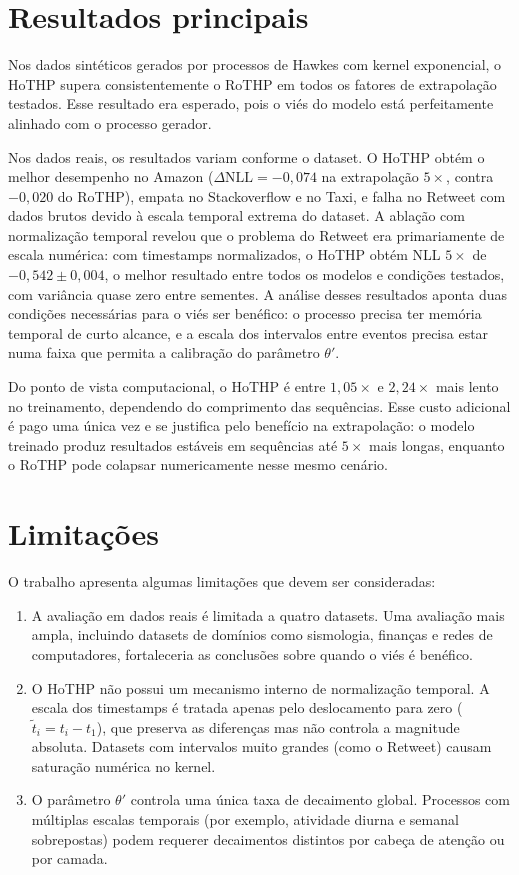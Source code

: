 \section{Resultados principais}

Nos dados sintéticos gerados por processos de Hawkes com kernel exponencial, o HoTHP supera consistentemente o RoTHP em todos os fatores de extrapolação testados. Esse resultado era esperado, pois o viés do modelo está perfeitamente alinhado com o processo gerador.

Nos dados reais, os resultados variam conforme o dataset. O HoTHP obtém o melhor desempenho no Amazon ($\Delta\text{NLL} = -0{,}074$ na extrapolação $5\times$, contra $-0{,}020$ do RoTHP), empata no Stackoverflow e no Taxi, e falha no Retweet com dados brutos devido à escala temporal extrema do dataset. A ablação com normalização temporal revelou que o problema do Retweet era primariamente de escala numérica: com timestamps normalizados, o HoTHP obtém NLL $5\times$ de $-0{,}542 \pm 0{,}004$, o melhor resultado entre todos os modelos e condições testados, com variância quase zero entre sementes. A análise desses resultados aponta duas condições necessárias para o viés ser benéfico: o processo precisa ter memória temporal de curto alcance, e a escala dos intervalos entre eventos precisa estar numa faixa que permita a calibração do parâmetro $\theta'$.

Do ponto de vista computacional, o HoTHP é entre $1{,}05\times$ e $2{,}24\times$ mais lento no treinamento, dependendo do comprimento das sequências. Esse custo adicional é pago uma única vez e se justifica pelo benefício na extrapolação: o modelo treinado produz resultados estáveis em sequências até $5\times$ mais longas, enquanto o RoTHP pode colapsar numericamente nesse mesmo cenário.

\section{Limitações}

O trabalho apresenta algumas limitações que devem ser consideradas:

\begin{enumerate}
    \item A avaliação em dados reais é limitada a quatro datasets. Uma avaliação mais ampla, incluindo datasets de domínios como sismologia, finanças e redes de computadores, fortaleceria as conclusões sobre quando o viés é benéfico.

    \item O HoTHP não possui um mecanismo interno de normalização temporal. A escala dos timestamps é tratada apenas pelo deslocamento para zero ($\tilde{t}_i = t_i - t_1$), que preserva as diferenças mas não controla a magnitude absoluta. Datasets com intervalos muito grandes (como o Retweet) causam saturação numérica no kernel.

    \item O parâmetro $\theta'$ controla uma única taxa de decaimento global. Processos com múltiplas escalas temporais (por exemplo, atividade diurna e semanal sobrepostas) podem requerer decaimentos distintos por cabeça de atenção ou por camada.
\end{enumerate}

